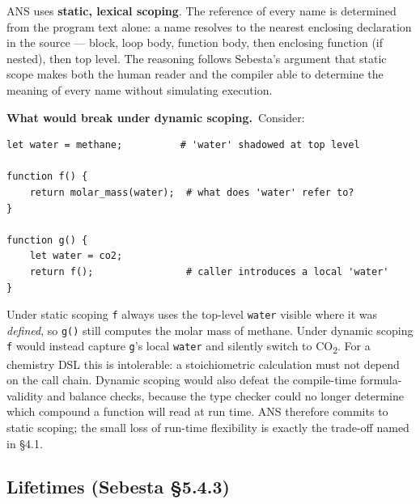 \documentclass[11pt,a4paper]{article}
\newcommand{\code}[1]{\texttt{#1}}
\begin{document}
ANS uses \textbf{static, lexical scoping}. The reference of every name is
determined from the program text alone: a name resolves to the nearest
enclosing declaration in the source --- block, loop body, function body,
then enclosing function (if nested), then top level. The reasoning follows
Sebesta's argument that static scope makes both the human reader and the
compiler able to determine the meaning of every name without simulating
execution.

\textbf{What would break under dynamic scoping.}\, Consider:

\begin{lstlisting}
let water = methane;          # 'water' shadowed at top level

function f() {
    return molar_mass(water);  # what does 'water' refer to?
}

function g() {
    let water = co2;
    return f();                # caller introduces a local 'water'
}
\end{lstlisting}

Under static scoping \code{f} always uses the top-level \code{water} visible
where it was \textit{defined}, so \code{g()} still computes the molar mass of
methane. Under dynamic scoping \code{f} would instead capture \code{g}'s
local \code{water} and silently switch to CO\textsubscript{2}. For a chemistry
DSL this is intolerable: a stoichiometric calculation must not depend on the
call chain. Dynamic scoping would also defeat the compile-time
formula-validity and balance checks, because the type checker could no longer
determine which compound a function will read at run time. ANS therefore
commits to static scoping; the small loss of run-time flexibility is exactly
the trade-off named in \S4.1.

\subsection{Lifetimes (Sebesta \S5.4.3)}
\end{document}
